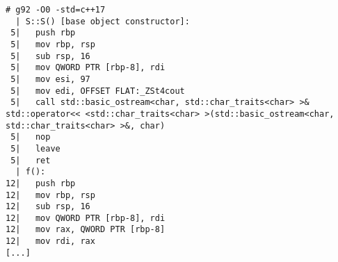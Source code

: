 \begin{lstlisting}[language={},numbers=none,title=\href{https://godbolt.org/z/0fo_Aq}{\texttt{godbolt.org/z/0fo\_Aq}}]
# g92 -O0 -std=c++17
  | S::S() [base object constructor]:
 5|   push rbp
 5|   mov rbp, rsp
 5|   sub rsp, 16
 5|   mov QWORD PTR [rbp-8], rdi
 5|   mov esi, 97
 5|   mov edi, OFFSET FLAT:_ZSt4cout
 5|   call std::basic_ostream<char, std::char_traits<char> >& std::operator<< <std::char_traits<char> >(std::basic_ostream<char, std::char_traits<char> >&, char)
 5|   nop
 5|   leave
 5|   ret
  | f():
12|   push rbp
12|   mov rbp, rsp
12|   sub rsp, 16
12|   mov QWORD PTR [rbp-8], rdi
12|   mov rax, QWORD PTR [rbp-8]
12|   mov rdi, rax
[...]
\end{lstlisting}
